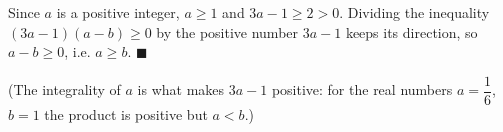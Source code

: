 Since $a$ is a positive integer, $a\ge1$ and $3a-1\ge2>0$. Dividing the inequality $(3a-1)(a-b)\ge0$ by the positive number $3a-1$ keeps its direction, so $a-b\ge0$, i.e. $a\ge b$. $\blacksquare$

(The integrality of $a$ is what makes $3a-1$ positive: for the real numbers $a=\dfrac16$, $b=1$ the product is positive but $a<b$.)
